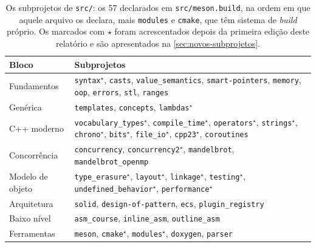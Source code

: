 \begin{table}[htbp]
\centering
\caption{Os subprojetos de \texttt{src/}: os 57 declarados em
         \texttt{src/meson.build}, na ordem em que aquele arquivo os declara,
         mais \texttt{modules} e \texttt{cmake}, que têm sistema de
         \emph{build} próprio. Os marcados com $\star$ foram acrescentados
         depois da primeira edição deste relatório e são apresentados na
         \cref{sec:novos-subprojetos}.}
\label{tab:panorama}
\footnotesize
\begin{tabular}{@{}lp{}@{}}
\toprule
\textbf{Bloco} & \textbf{Subprojetos} \\
\midrule
Fundamentos          & \texttt{syntax}$^\star$, \texttt{casts},
                       \texttt{value\_semantics}, \texttt{smart-pointers},
                       \texttt{memory}, \texttt{oop}, \texttt{errors},
                       \texttt{stl}, \texttt{ranges} \\
Genérica             & \texttt{templates}, \texttt{concepts},
                       \texttt{lambdas}$^\star$ \\
C++ moderno          & \texttt{vocabulary\_types}$^\star$,
                       \texttt{compile\_time}$^\star$,
                       \texttt{operators}$^\star$, \texttt{strings}$^\star$,
                       \texttt{chrono}$^\star$, \texttt{bits}$^\star$,
                       \texttt{file\_io}$^\star$, \texttt{cpp23}$^\star$,
                       \texttt{coroutines} \\
Concorrência         & \texttt{concurrency}, \texttt{concurrency2}$^\star$,
                       \texttt{mandelbrot}, \texttt{mandelbrot\_openmp} \\
Modelo de objeto     & \texttt{type\_erasure}$^\star$, \texttt{layout}$^\star$,
                       \texttt{linkage}$^\star$, \texttt{testing}$^\star$,
                       \texttt{undefined\_behavior}$^\star$,
                       \texttt{performance}$^\star$ \\
Arquitetura          & \texttt{solid}, \texttt{design-of-pattern},
                       \texttt{ecs}, \texttt{plugin\_registry} \\
Baixo nível          & \texttt{asm\_course}, \texttt{inline\_asm},
                       \texttt{outline\_asm} \\
Ferramentas          & \texttt{meson}, \texttt{cmake}$^\star$,
                       \texttt{modules}$^\star$, \texttt{doxygen},
                       \texttt{parser} \\

\end{tabular}
\end{table}
